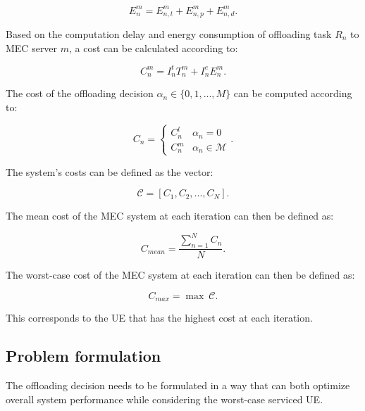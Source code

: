 \documentclass[conference]{IEEEtran}
\begin{document}
\begin{equation}
    E_n^m = E_{n,t}^m + E_{n,p}^m + E_{n, d}^m .
\end{equation}

Based on the computation delay and energy consumption of offloading task $R_n$ to \acrshort{MEC} server $m$, a cost can be calculated according to:

\begin{equation}
    C_n^m = I_n^t T_n^m + I_n^e E_n^m .
\end{equation}

The cost of the offloading decision $\alpha_n \in \{0, 1, ..., M\}$ can be computed according to:

\begin{equation}
    C_n =
    \begin{cases}
        C_n^l & \alpha_n = 0             \\
        C_n^m & \alpha_n \in \mathcal{M}
    \end{cases} .
\end{equation}

The system's costs can be defined as the vector:

\begin{equation}
    \mathcal{C} = [C_1, C_2, ..., C_N].
\end{equation}


The mean cost of the \acrshort{MEC} system at each iteration can then be defined as:

\begin{equation} \label{C_mean}
    C_{mean} = \frac{\sum\limits_{n=1}^N C_n}{N}.
\end{equation}

The worst-case cost of the \acrshort{MEC} system at each iteration can then be defined as:

\begin{equation}
    C_{max} = \max \ \mathcal{C}.
\end{equation}

This corresponds to the \acrshort{UE} that has the highest cost at each iteration.

\subsection{Problem formulation}
\noindent The offloading decision needs to be formulated in a way that can both optimize overall system performance while considering the worst-case serviced \acrshort{UE}.
\end{document}

